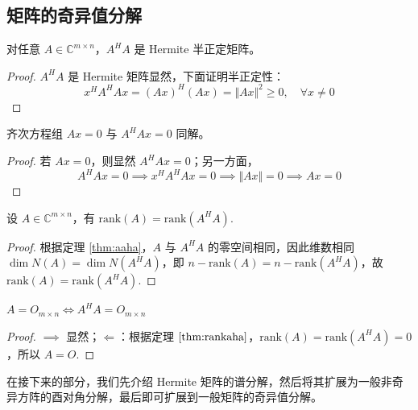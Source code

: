 \subsection{矩阵的奇异值分解}

\begin{theorem}
对任意 $A\in\mathbb C^{m\times n}$，$A^HA$ 是 Hermite 半正定矩阵。
\end{theorem}
\begin{proof}
$A^HA$ 是 Hermite 矩阵显然，下面证明半正定性：
\[x^HA^HAx=(Ax)^H(Ax)=\Vert Ax\Vert^2\geq 0,\quad \forall x\neq 0\]
\end{proof}

\begin{theorem}
\label{thm:aaha}
齐次方程组 $Ax=0$ 与 $A^HAx=0$ 同解。
\end{theorem}
\begin{proof}
若 $Ax=0$，则显然 $A^HAx=0$；另一方面，
\[
    A^HAx=0\implies x^HA^HAx=0\implies\Vert Ax\Vert=0\implies Ax=0
\]
\end{proof}

\begin{theorem}
\label{thm:rankaha}
设 $A\in\mathbb C^{m\times n}$，有 $\text{rank}(A)=\text{rank}(A^HA)$.
\end{theorem}
\begin{proof}
根据定理 \ref{thm:aaha}，$A$ 与 $A^HA$ 的零空间相同，因此维数相同 $\dim N(A)=\dim N(A^HA)$，即 $n-\text{rank}(A)=n-\text{rank}(A^HA)$，故 $\text{rank}(A)=\text{rank}(A^HA)$.
\end{proof}

\begin{theorem}
$A=O_{m\times n}\iff A^HA=O_{m\times n}$
\end{theorem}
\begin{proof}
$\implies$ 显然；$\Longleftarrow$：根据定理 $\ref{thm:rankaha}$，$\text{rank}(A)=\text{rank}(A^HA)=0$，所以 $A=O$.
\end{proof}

在接下来的部分，我们先介绍 Hermite 矩阵的谱分解，然后将其扩展为一般非奇异方阵的酉对角分解，最后即可扩展到一般矩阵的奇异值分解。

